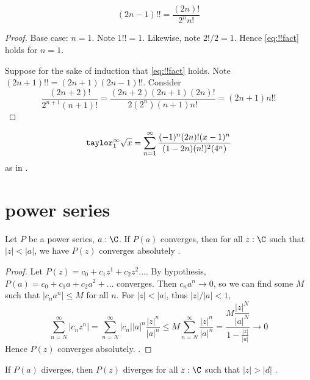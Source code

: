 \documentclass[10pt]{scrartcl}
\numberwithin{thms}{section}
\begin{document}

\begin{lemma}
  \begin{equation}
    (2n-1)!!=\frac{(2n)!}{2^nn!}\label{eq:!!fact}
  \end{equation}
\end{lemma}
\begin{proof}
  Base case: $n=1$. Note $1!!=1$. Likewise, note $2!/2=1$. Hence \cref{eq:!!fact} holds for $n=1$. 

  Suppose for the sake of induction that \cref{eq:!!fact} holds. Note
  $(2n+1)!!=(2n+1)(2n-1)!!$. Consider 
  \[
  \frac{(2n+2)!}{2^{n+1}(n+1)!}=\frac{(2n+2)(2n+1)(2n)!}{2(2^n)(n+1)n!}=(2n+1)n!!
  \]
\end{proof}
\begin{cor}
  \[
  \mathtt{taylor}_1^\infty\sqrt x= \sum_{n=1}^\infty\frac{(-1)^n(2n)!(x-1)^n}{(1-2n)(n!)^2(4^n)}
  \]
  as in \cite{wiki:sqrt}.
\end{cor}
\section{power series}
\begin{theorem}
  Let $P$ be a power series, $a:\C$. If $P(a)$ converges, then for all $z:\C$ such that $|z|<|a|$, we have $P(z)$ converges absolutely \cite{needham:visual-complex}.
\end{theorem}
\begin{proof}
  Let $P(z)=c_0+c_1z^1+c_2z^2\dots$. By hypothesis, $P(a)=c_0+c_1a+c_2a^2+\dots$ converges. Then $c_na^n\to 0$, so we can find some $M$ such that $|c_na^n|\leq M$ for all $n$. For $|z|<|a|$, thus $|z|/|a|<1$, 
  \[
  \sum_{n=N}^\infty |c_n z^n|=\sum_{n=N}^\infty |c_n||a|^n \frac{|z|^n}{|a|^n} \leq M\sum_{n=N}^\infty \frac{|z|^n}{|a|^n} =\dfrac{M\dfrac{|z|^N}{|a|^N}}{1-\frac{|z|}{|a|}}\to 0
  \]
  Hence $P(z)$ converges absolutely.
  \cite{needham:visual-complex}. 
\end{proof}
\begin{cor}
  If $P(a)$ diverges, then $P(z)$ diverges for all $z:\C$ such that $|z|>|d|$
\cite{needham:visual-complex}. 
\end{cor}
\end{document}
